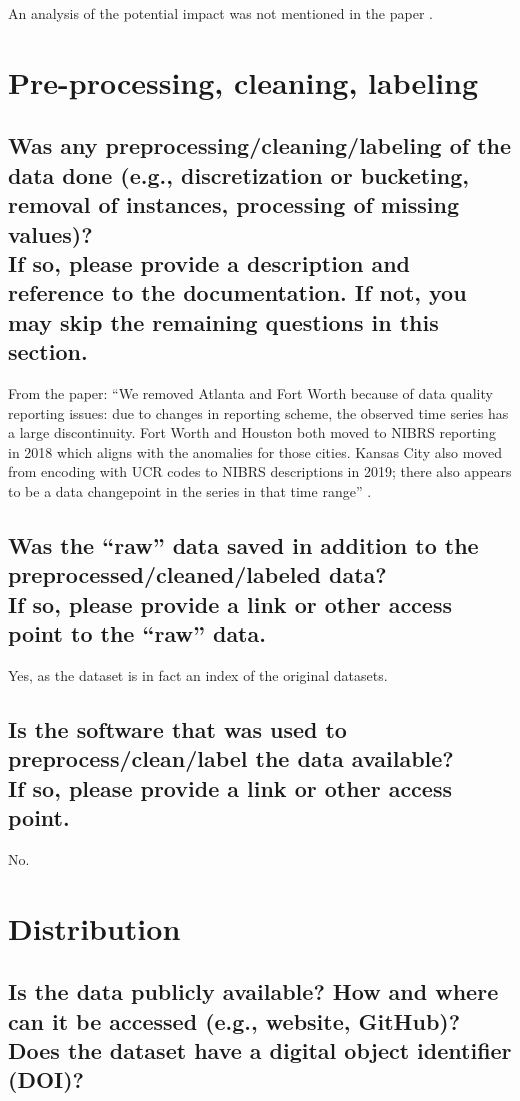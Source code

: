 \documentclass[letterpaper, 10 pt, conference]{ieeeconf}  %
\newcommand{\subtitle}[1]{{\\ \small \normalfont \color{purple} #1}}
\begin{document}
An analysis of the potential impact was not mentioned in the paper \cite{zhou2021empirical}. 

\section{Pre-processing, cleaning, labeling}

\subsection{Was any preprocessing/cleaning/labeling of the data done (e.g., discretization or bucketing, removal of instances, processing of missing values)? \subtitle{If so, please provide a description and reference to the documentation. If not, you may skip the remaining questions in this section.}}

From the paper: ``We removed Atlanta and Fort Worth because of data quality reporting issues: due to changes in reporting scheme, the observed time series has a large discontinuity. Fort Worth and Houston both moved to NIBRS reporting in 2018 which aligns with the anomalies for those cities. Kansas City also moved from encoding with UCR codes to NIBRS descriptions in 2019; there also appears to be a data changepoint in the series in that time range'' \cite{zhou2021empirical}. 

\subsection{Was the “raw” data saved in addition to the preprocessed/cleaned/labeled data? \subtitle{If so, please provide a link or other access point to the “raw” data. }}

Yes, as the dataset is in fact an index of the original datasets. 

\subsection{Is the software that was used to preprocess/clean/label the data available? \subtitle{If so, please provide a link or other access point.}}

No.

\section{Distribution}
\subsection{Is the data publicly available? How and where can it be accessed (e.g., website, GitHub)? \subtitle{Does the dataset have a digital object identifier (DOI)?}}
\end{document}
